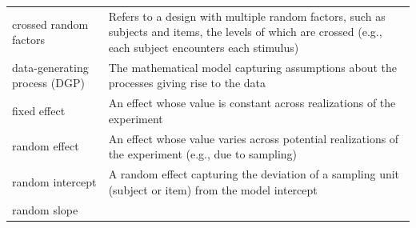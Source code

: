 \documentclass[english,doc,floatsintext]{apa6}
\begin{document}
\begin{tcolorbox}[colback=black!5!white,colframe=white!5!black,title=Box 1. Glossary of terms]
\begin{longtable}[]{@{}ll@{}}
\begin{minipage}[t]{0.29\columnwidth}\raggedright
crossed random factors\strut
\end{minipage} & \begin{minipage}[t]{0.65\columnwidth}\raggedright
Refers to a design with multiple random factors, such as subjects and items, the levels of which are crossed (e.g., each subject encounters each stimulus) \strut
\end{minipage}\tabularnewline
\begin{minipage}[t]{0.29\columnwidth}\raggedright
data-generating process (DGP)\strut
\end{minipage} & \begin{minipage}[t]{0.65\columnwidth}\raggedright
The mathematical model capturing assumptions about the processes giving rise to the data\strut
\end{minipage}\tabularnewline
\begin{minipage}[t]{0.29\columnwidth}\raggedright
fixed effect\strut
\end{minipage} & \begin{minipage}[t]{0.65\columnwidth}\raggedright
An effect whose value is constant across realizations of the experiment\strut
\end{minipage}\tabularnewline
\begin{minipage}[t]{0.29\columnwidth}\raggedright
random effect\strut
\end{minipage} & \begin{minipage}[t]{0.65\columnwidth}\raggedright
An effect whose value varies across potential realizations of the experiment (e.g., due to sampling)\strut
\end{minipage}\tabularnewline
\begin{minipage}[t]{0.29\columnwidth}\raggedright
random intercept\strut
\end{minipage} & \begin{minipage}[t]{0.65\columnwidth}\raggedright
A random effect capturing the deviation of a sampling unit (subject or item) from the model intercept\strut
\end{minipage}\tabularnewline
\begin{minipage}[t]{0.29\columnwidth}\raggedright
random slope\strut
\end{minipage} & \begin{minipage}[t]{0.65\columnwidth}\raggedright

\end{minipage}
\end{longtable}
\end{tcolorbox}
\end{document}
